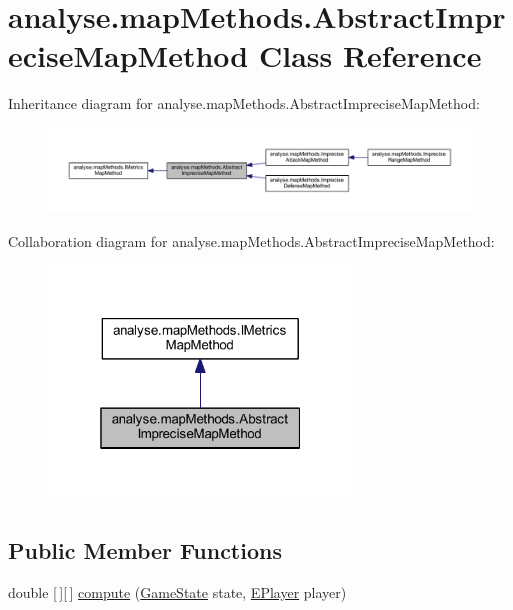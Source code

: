\hypertarget{classanalyse_1_1map_methods_1_1_abstract_imprecise_map_method}{}\section{analyse.\+map\+Methods.\+Abstract\+Imprecise\+Map\+Method Class Reference}
\label{classanalyse_1_1map_methods_1_1_abstract_imprecise_map_method}


Inheritance diagram for analyse.\+map\+Methods.\+Abstract\+Imprecise\+Map\+Method\+:
\nopagebreak
\begin{figure}[H]
\begin{center}
\leavevmode
\includegraphics[width=350pt]{classanalyse_1_1map_methods_1_1_abstract_imprecise_map_method__inherit__graph}
\end{center}
\end{figure}


Collaboration diagram for analyse.\+map\+Methods.\+Abstract\+Imprecise\+Map\+Method\+:
\nopagebreak
\begin{figure}[H]
\begin{center}
\leavevmode
\includegraphics[width=229pt]{classanalyse_1_1map_methods_1_1_abstract_imprecise_map_method__coll__graph}
\end{center}
\end{figure}
\subsection*{Public Member Functions}
\begin{DoxyCompactItemize}
\item 
double \mbox{[}$\,$\mbox{]}\mbox{[}$\,$\mbox{]} \mbox{\hyperlink{classanalyse_1_1map_methods_1_1_abstract_imprecise_map_method_a05c258bdd82babbaad63b4a9a5bbb063}{compute}} (\mbox{\hyperlink{classgame_1_1game_state_1_1_game_state}{Game\+State}} state, \mbox{\hyperlink{enumgame_1_1_e_player}{E\+Player}} player)
\end{DoxyCompactItemize}

